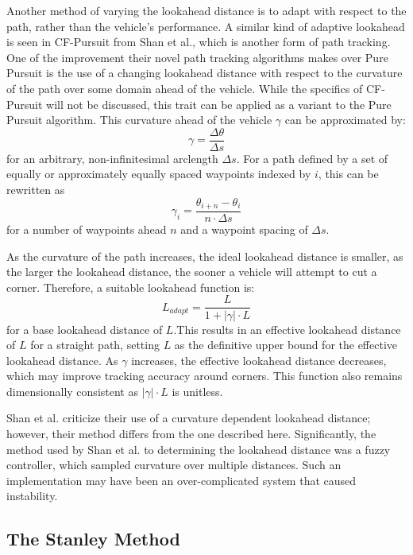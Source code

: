 \documentclass[12pt]{article}
\begin{document}
\begin{flushleft}
Another method of varying the lookahead distance is to adapt with respect to the path, rather than the vehicle's performance. A similar kind of adaptive lookahead is seen in CF-Pursuit from Shan et al., which is another form of path tracking. One of the improvement their novel path tracking algorithms makes over Pure Pursuit is the use of a changing lookahead distance with respect to the curvature of the path over some domain ahead of the vehicle. While the specifics of CF-Pursuit will not be discussed, this trait can be applied as a variant to the Pure Pursuit algorithm. This curvature ahead of the vehicle $\gamma$ can be approximated by: 
\begin{equation*}
\gamma = \frac{\Delta\theta}{\Delta s}
\end{equation*}
for an arbitrary, non-infinitesimal arclength $\Delta s$. For a path defined by a set of equally or approximately equally spaced waypoints indexed by $i$, this can be rewritten as
\begin{equation}
\gamma_i = \frac{\theta_{i+n}-\theta_i}{n \cdot \Delta s}
\end{equation}
for a number of waypoints ahead $n$ and a waypoint spacing of $\Delta s$.

As the curvature of the path increases, the ideal lookahead distance is smaller, as the larger the lookahead distance, the sooner a vehicle will attempt to cut a corner. Therefore, a suitable lookahead function is:
\begin{equation}
L_{adapt} = \frac{L}{1+|\gamma| \cdot L}
\end{equation}
for a base lookahead distance of $L$.This results in an effective lookahead distance of $L$ for a straight path, setting $L$ as the definitive upper bound for the effective lookahead distance. As $\gamma$ increases, the effective lookahead distance decreases, which may improve tracking accuracy around corners. This function also remains dimensionally consistent as $|\gamma| \cdot L$ is unitless.

Shan et al. criticize their use of a curvature dependent lookahead distance; however, their method differs from the one described here. Significantly, the method used by Shan et al. to determining the lookahead distance was a fuzzy controller, which sampled curvature over multiple distances. Such an implementation may have been an over-complicated system that caused instability.


\subsection{The Stanley Method}


\end{flushleft}
\end{document}
